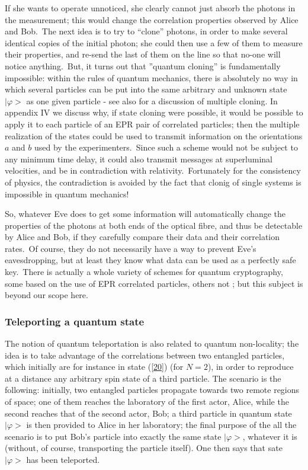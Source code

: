 \documentclass[12pt,onecolumn]{article}%
\begin{document}
If she wants to operate unnoticed, she clearly cannot just absorb the photons
in the measurement; this would change the correlation properties observed by
Alice and Bob.\ The next idea is to try to ``clone'' photons, in order to make
several identical copies of the initial photon; she could then use a few of
them to measure their properties, and re-send the last of them on the line so
that no-one will notice anything.\ But, it turns out that ''quantum cloning''
is fundamentally impossible: within the rules of quantum mechanics, there is
absolutely no way in which several particles can be put into the same
arbitrary and unknown state $|\varphi>$ as one given particle
\cite{Wooters-Zurek} \cite{Dieks} - see also \cite{Gisin-Massar} for a
discussion of multiple cloning. In appendix IV we discuss why, if state
cloning were possible, it would be possible to apply it to each particle of an
EPR pair of correlated particles; then the multiple realization of the states
could be used to transmit information on the orientations $a$ and $b$ used by
the experimenters.\ Since such a scheme would not be subject to any minimum
time delay, it could also transmit messages at superluminal velocities, and be
in contradiction with relativity.\ Fortunately for the consistency of physics,
the contradiction is avoided by the fact that clonig of single systems is
impossible in quantum mechanics!

So, whatever Eve does to get some information will automatically change the
properties of the photons at both ends of the optical fibre, and thus be
detectable by Alice and Bob, if they carefully compare their data and their
correlation rates.\ Of course, they do not necessarily have a way to prevent
Eve's eavesdropping, but at least they know what data can be used as a
perfectly safe key.\ There is actually a whole variety of schemes for quantum
cryptography, some based on the use of EPR correlated particles, others not
\cite{Bennett2}; but this subject is beyond our scope here.

\subsubsection{Teleporting a quantum state}

The notion of quantum teleportation \cite{Bennett1} is also related to quantum
non-locality; the idea is to take advantage of the correlations between two
entangled particles, which initially are for instance in state (\ref{20}) (for
$N=2$), in order to reproduce at a distance any arbitrary spin state of a
third particle. The scenario is the following: initially, two entangled
particles propagate towards two remote regions of space; one of them reaches
the laboratory of the first actor, Alice, while the second reaches that of the
second actor, Bob; a third particle in quantum state $|\varphi>$ is then
provided to Alice in her laboratory; the final purpose of the all the scenario
is to put Bob's particle into exactly the same state $|\varphi>$, whatever
it is (without, of course, transporting the particle itself). One then says
that sate $|\varphi>$ has been teleported.
\end{document}
